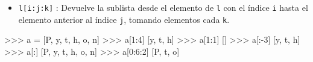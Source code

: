 \documentclass[
  spanish,
  a4paper,
]{scrreport}
\newenvironment{Shaded}{\begin{snugshade}}{\end{snugshade}}
\newcommand{\DecValTok}[1]{\textcolor[rgb]{0.68,0.00,0.00}{#1}}
\newcommand{\NormalTok}[1]{\textcolor[rgb]{0.00,0.23,0.31}{#1}}
\newcommand{\OperatorTok}[1]{\textcolor[rgb]{0.37,0.37,0.37}{#1}}
\newcommand{\StringTok}[1]{\textcolor[rgb]{0.13,0.47,0.30}{#1}}
\providecommand{\tightlist}{%
  \setlength{\itemsep}{0pt}\setlength{\parskip}{0pt}}
\begin{document}
\begin{itemize}
\tightlist
\item
  \texttt{l{[}i:j:k{]}} : Devuelve la sublista desde el elemento de
  \texttt{l} con el índice \texttt{i} hasta el elemento anterior al
  índice \texttt{j}, tomando elementos cada \texttt{k}.
\end{itemize}

\begin{Shaded}
\begin{Highlighting}[]
\OperatorTok{\textgreater{}\textgreater{}\textgreater{}}\NormalTok{ a }\OperatorTok{=}\NormalTok{ [}\StringTok{\textquotesingle{}P\textquotesingle{}}\NormalTok{, }\StringTok{\textquotesingle{}y\textquotesingle{}}\NormalTok{, }\StringTok{\textquotesingle{}t\textquotesingle{}}\NormalTok{, }\StringTok{\textquotesingle{}h\textquotesingle{}}\NormalTok{, }\StringTok{\textquotesingle{}o\textquotesingle{}}\NormalTok{, }\StringTok{\textquotesingle{}n\textquotesingle{}}\NormalTok{]}
\OperatorTok{\textgreater{}\textgreater{}\textgreater{}}\NormalTok{ a[}\DecValTok{1}\NormalTok{:}\DecValTok{4}\NormalTok{]}
\NormalTok{[}\StringTok{\textquotesingle{}y\textquotesingle{}}\NormalTok{, }\StringTok{\textquotesingle{}t\textquotesingle{}}\NormalTok{, }\StringTok{\textquotesingle{}h\textquotesingle{}}\NormalTok{]}
\OperatorTok{\textgreater{}\textgreater{}\textgreater{}}\NormalTok{ a[}\DecValTok{1}\NormalTok{:}\DecValTok{1}\NormalTok{]}
\NormalTok{[]}
\OperatorTok{\textgreater{}\textgreater{}\textgreater{}}\NormalTok{ a[:}\OperatorTok{{-}}\DecValTok{3}\NormalTok{]}
\NormalTok{[}\StringTok{\textquotesingle{}y\textquotesingle{}}\NormalTok{, }\StringTok{\textquotesingle{}t\textquotesingle{}}\NormalTok{, }\StringTok{\textquotesingle{}h\textquotesingle{}}\NormalTok{]}
\OperatorTok{\textgreater{}\textgreater{}\textgreater{}}\NormalTok{ a[:]}
\NormalTok{[}\StringTok{\textquotesingle{}P\textquotesingle{}}\NormalTok{, }\StringTok{\textquotesingle{}y\textquotesingle{}}\NormalTok{, }\StringTok{\textquotesingle{}t\textquotesingle{}}\NormalTok{, }\StringTok{\textquotesingle{}h\textquotesingle{}}\NormalTok{, }\StringTok{\textquotesingle{}o\textquotesingle{}}\NormalTok{, }\StringTok{\textquotesingle{}n\textquotesingle{}}\NormalTok{]}
\OperatorTok{\textgreater{}\textgreater{}\textgreater{}}\NormalTok{ a[}\DecValTok{0}\NormalTok{:}\DecValTok{6}\NormalTok{:}\DecValTok{2}\NormalTok{]}
\NormalTok{[}\StringTok{\textquotesingle{}P\textquotesingle{}}\NormalTok{, }\StringTok{\textquotesingle{}t\textquotesingle{}}\NormalTok{, }\StringTok{\textquotesingle{}o\textquotesingle{}}\NormalTok{]}
\end{Highlighting}
\end{Shaded}
\end{document}
